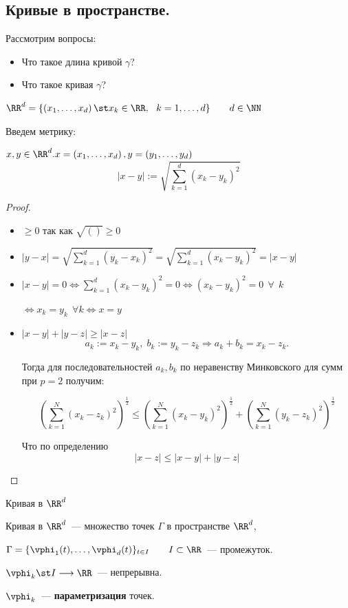 \subsection{Кривые в пространстве.}

Рассмотрим вопросы:

\begin{itemize}
    \item Что такое длина кривой $\gamma$?
    \item Что такое кривая $\gamma$?
\end{itemize}

$\RR^d = \{ \left( x_1, \ldots, x_d \right) \st x_k \in \RR, \ \ k = 1, \ldots, d \} \qquad d \in \NN$

Введем метрику:

$x, y \in \RR^d. x = \left(x_1, \ldots, x_d \right),  y = \left(y_1, \ldots, y_d \right)$
\[
|x - y| := \sqrt{\sum^d_{k=1}(x_k - y_k)^2}
\]

\begin{proof}
    \begin{itemize}
        \item $\ge 0$ так как $\sqrt{()} \ge 0$
        \item $|y - x| = \sqrt{\sum^d_{k=1}(y_k - x_k)^2} = \sqrt{\sum^d_{k=1}(x_k - y_k)^2} = |x - y|$
        \item $|x - y| = 0 \Leftrightarrow \sum^d_{k=1}(x_k - y_k)^2 = 0 \Leftrightarrow (x_k - y_k)^2 = 0 \ \ \forall \ \ k$
        
        $\Leftrightarrow x_k = y_k \ \ \forall k \Leftrightarrow x = y$
        \item $|x - y| + |y - z| \ge |x - z|$
        \[
        a_k := x_k - y_k, \; b_k := y_k - z_k \Rightarrow a_k + b_k = x_k - z_k.
        \]

        Тогда для последовательностей $a_k, b_k$ по неравенству Минковского для сумм при $p = 2$ получим:

        \[
        \left(\sum^N_{k=1}(x_k-z_k)^2 \right)^\frac{1}{2} \le \left(\sum^N_{k=1}(x_k-y_k)^2\right)^{\frac{1}{2}} + \left(\sum^N_{k=1}(y_k-z_k)^2\right)^{\frac{1}{2}}
        \]

        Что по определению
        \[
        |x - z| \le |x - y| + |y - z|
        \]
        
    \end{itemize}
\end{proof}

\begin{Definition}{Кривая в $\RR^d$}{}

    Кривая в $\RR^d$~--- множество точек $\Gamma$ в пространстве $\RR^d$,
    
    $\Gamma = \{ \vphi_1(t), \ldots, \vphi_d(t) \}_{t \in I} \qquad I \subset \RR$~--- промежуток.

    $\vphi_k \st I \longrightarrow \RR$~--- непрерывна.
    
    $\vphi_k$~--- \textbf{параметризация} точек.
\end{Definition}

